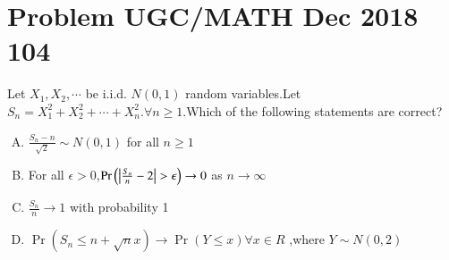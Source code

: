\documentclass[journal,12pt,twocolumn]{IEEEtran}
\begin{document}
\section{Problem UGC/MATH Dec 2018 104}
Let $X_1,X_2, \cdots$ be i.i.d. $N(0,1)$ random variables.Let $S_{n}=X_{1}^2+X_{2}^2+\cdots+X_{n}^2.\forall n\geq 1.$Which of the following statements are correct?
\begin{enumerate}[(A)]

\setlength\itemsep{1em}
\item $\frac{S_{n}-n}{\sqrt{2}}\sim N(0,1)$ for all $n\geq 1$
\item For all $\epsilon > 0$,$\Pr{\brak{\left|\frac{S_n}{n}-2\right|>\epsilon}}\to 0$ as $n \to \infty$
\item $\frac{S_{n}}{n} \to 1$ with probability 1
\item $\Pr({S_{n} \leq n+\sqrt{n}x}) \to \Pr({Y \leq x}) \forall x\in R$ ,where $Y \sim N(0,2)$

\end{enumerate}
\end{document}
